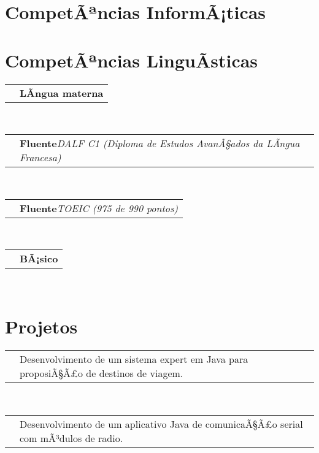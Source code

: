 \documentclass[11pt,a4paper,sans]{moderncv}
\makeatletter
\renewcommand*{\cvlanguage}[3]{%
  \cvline{#1}{\textbf{#2}\hspace*{\separatorcolumnwidth}\emph{#3}}}
\renewcommand*{\cvline}[3][.25em]{%
	  \begin{tabular}{@{}p{\hintscolumnwidth}@{\hspace{\separatorcolumnwidth}}p{\maincolumnwidth}@{}}%
          \centering\hintfont{#2} &{#3}%
	  \end{tabular}\\[#1]}
\makeatother
\begin{document}
\section{CompetÃªncias InformÃ¡ticas}
\SECTIONSPACE
\section{CompetÃªncias LinguÃ­sticas}
\cvlanguage{PortuguÃªs}{LÃ­ngua materna}{}
\cvlanguage{FrancÃªs}{Fluente}{DALF C1 (Diploma de Estudos AvanÃ§ados da LÃ­ngua Francesa)}
\cvlanguage{InglÃªs}{Fluente}{TOEIC (975 de 990 pontos)}
\cvlanguage{JaponÃªs}{BÃ¡sico}{}
\SECTIONSPACE
\section{Projetos}
\cvline{InteligÃªncia Artificial}{Desenvolvimento de um sistema expert em Java para proposiÃ§Ã£o de destinos de viagem. \newline{\emph{ImplementaÃ§Ã£o dos mÃ©todos de encadeamento e desenvolvimento da interface grÃ¡ï¬ca em Swing}} \newline{\emph{}}\ENTRYSPACE}
\cvline{Tratamento de Dados}{Desenvolvimento de um aplicativo Java de comunicaÃ§Ã£o serial com mÃ³dulos de radio. \newline{\emph{DocumentaÃ§Ã£o do programa e tutorial explicativo}} \newline{\emph{Controle de versÃ£o com Git}}}
\end{document}
